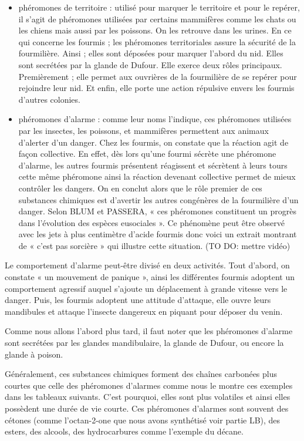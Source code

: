 \begin{itemize}
\item
  phéromones de territoire : utilisé pour marquer le territoire et pour
  le repérer, il s'agit de phéromones utilisées par certains mammifères
  comme les chats ou les chiens mais aussi par les poissons. On les
  retrouve dans les urines. En ce qui concerne les fourmis ; les
  phéromones territoriales assure la sécurité de la fourmilière. Ainsi ;
  elles sont déposées pour marquer l'abord du nid. Elles sont secrétées
  par la glande de Dufour. Elle exerce deux rôles principaux.
  Premièrement ; elle permet aux ouvrières de la fourmilière de se
  repérer pour rejoindre leur nid. Et enfin, elle porte une action
  répulsive envers les fourmis d'autres colonies.
  
\item
  phéromones d'alarme : comme leur noms l'indique, ces phéromones
  utilisées par les insectes, les poissons, et mammifères permettent aux
  animaux d'alerter d'un danger. Chez les fourmis, on constate que la
  réaction agit de façon collective. En effet, dès lors qu'une fourmi
  sécrète une phéromone d'alarme, les autres fourmis présentent
  réagissent et sécrètent à leurs tours cette même phéromone ainsi la
  réaction devenant collective permet de mieux contrôler les dangers. On
  en conclut alors que le rôle premier de ces substances chimiques est
  d'avertir les autres congénères de la fourmilière d'un danger. Selon
  BLUM et PASSERA, « ces phéromones constituent un progrès dans
  l'évolution des espèces eusociales ». Ce phénomène peut être observé
  avec les jets à plus centimètre d'acide fourmis donc voici un extrait
  montrant de « c'est pas sorcière » qui illustre cette situation. (TO
  DO: mettre vidéo)
\end{itemize}

Le comportement d'alarme peut-être divisé en deux activités. Tout
d'abord, on constate « un mouvement de panique », ainsi les différentes
fourmis adoptent un comportement agressif auquel s'ajoute un déplacement
à grande vitesse vers le danger. Puis, les fourmis adoptent une attitude
d'attaque, elle ouvre leurs mandibules et attaque l'insecte dangereux en
piquant pour déposer du venin.

Comme nous allons l'abord plus tard, il faut noter que les phéromones
d'alarme sont secrétées par les glandes mandibulaire, la glande de
Dufour, ou encore la glande à poison.

Généralement, ces substances chimiques forment des chaînes carbonées
plus courtes que celle des phéromones d'alarmes comme nous le montre ces
exemples dans les tableaux suivants. C'est pourquoi, elles sont plus
volatiles et ainsi elles possèdent une durée de vie courte. Ces
phéromones d'alarmes sont souvent des cétones (comme l'octan-2-one que
nous avons synthétisé voir partie LB), des esters, des alcools, des
hydrocarbures comme l'exemple du décane.

